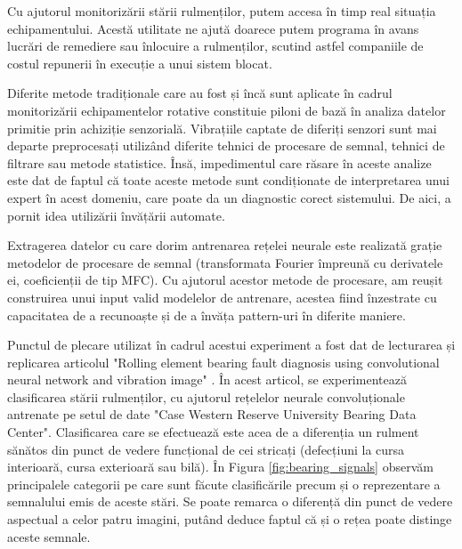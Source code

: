 \documentclass[a4paper,12pt]{report}
\begin{document}
    	Cu ajutorul monitorizării stării rulmenților, putem accesa în timp real situația echipamentului. Acestă utilitate ne ajută doarece putem programa în avans lucrări de remediere sau înlocuire a rulmenților, scutind astfel companiile de costul repunerii în execuție a unui sistem blocat.
    	
    	Diferite metode tradiționale care au fost și încă sunt aplicate în cadrul monitorizării echipamentelor rotative constituie piloni de bază în analiza datelor primitie prin achiziție senzorială. Vibrațiile captate de diferiți senzori sunt mai departe preprocesați utilizând diferite tehnici de procesare de semnal, tehnici de filtrare sau metode statistice. Însă, impedimentul care răsare în aceste analize este dat de faptul că toate aceste metode sunt condiționate de interpretarea unui expert în acest domeniu, care poate da un diagnostic corect sistemului. De aici, a pornit idea utilizării învățării automate.
    	
    	Extragerea datelor cu care dorim antrenarea rețelei neurale este realizată grație metodelor de procesare de semnal (transformata Fourier împreună cu derivatele ei, coeficienții de tip MFC). Cu ajutorul acestor metode de procesare, am reușit construirea unui input valid modelelor de antrenare, acestea fiind înzestrate cu capacitatea de a recunoaște și de a învăța pattern-uri în diferite maniere.
    	
    	Punctul de plecare utilizat în cadrul acestui experiment a fost dat de lecturarea și replicarea articolul "Rolling element bearing fault diagnosis using convolutional neural network and vibration image" \cite{rolling_elemnt}. În acest articol, se experimentează clasificarea stării rulmenților, cu ajutorul rețelelor neurale convoluționale antrenate pe setul de date "Case Western Reserve University Bearing Data Center". Clasificarea care se efectuează este acea de a diferenția un rulment sănătos din punct de vedere funcțional de cei stricați (defecțiuni la cursa interioară, cursa exterioară sau bilă). În Figura \ref{fig:bearing_signals} observăm principalele categorii pe care sunt făcute clasificările precum și o reprezentare a semnalului emis de aceste stări. Se poate remarca o diferență din punct de vedere aspectual a celor patru imagini, putând deduce faptul că și o rețea poate distinge aceste semnale.
    	
\end{document}
